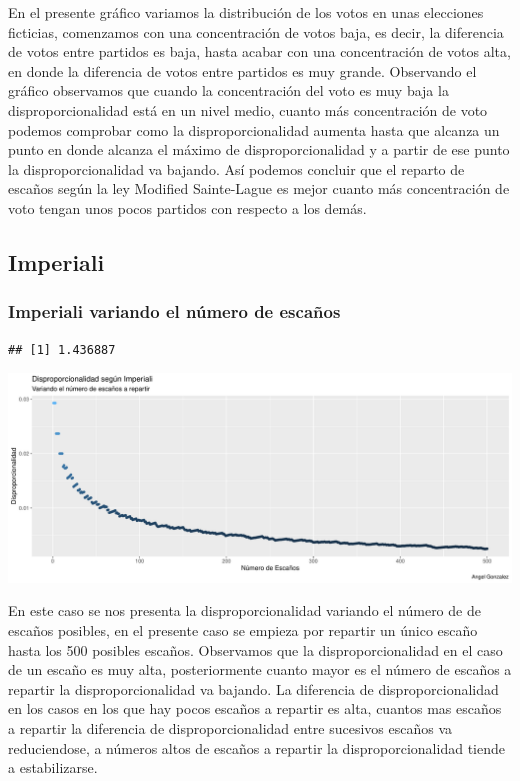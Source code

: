 \documentclass[12pt,a4paper,]{book}
\numberwithin{dummy}{section}
\theoremstyle{ocrenumbox}
\theoremstyle{blacknumex}
\theoremstyle{blacknumbox}
\theoremstyle{ocrenum}
\theoremstyle{ocrenum}
\begin{document}
En el presente gráfico variamos la distribución de los votos en unas
elecciones ficticias, comenzamos con una concentración de votos baja, es
decir, la diferencia de votos entre partidos es baja, hasta acabar con
una concentración de votos alta, en donde la diferencia de votos entre
partidos es muy grande. Observando el gráfico observamos que cuando la
concentración del voto es muy baja la disproporcionalidad está en un
nivel medio, cuanto más concentración de voto podemos comprobar como la
disproporcionalidad aumenta hasta que alcanza un punto en donde alcanza
el máximo de disproporcionalidad y a partir de ese punto la
disproporcionalidad va bajando. Así podemos concluir que el reparto de
escaños según la ley Modified Sainte-Lague es mejor cuanto más
concentración de voto tengan unos pocos partidos con respecto a los
demás.

\hypertarget{imperiali}{%
\subsection{Imperiali}\label{imperiali}}

\hypertarget{imperiali-variando-el-nuxfamero-de-escauxf1os}{%
\subsubsection{Imperiali variando el número de
escaños}\label{imperiali-variando-el-nuxfamero-de-escauxf1os}}

\begin{verbatim}
## [1] 1.436887
\end{verbatim}

\begin{center}\includegraphics[width=0.95\linewidth]{figurasR/unnamed-chunk-24-1} \end{center}

En este caso se nos presenta la disproporcionalidad variando el número
de de escaños posibles, en el presente caso se empieza por repartir un
único escaño hasta los 500 posibles escaños. Observamos que la
disproporcionalidad en el caso de un escaño es muy alta, posteriormente
cuanto mayor es el número de escaños a repartir la disproporcionalidad
va bajando. La diferencia de disproporcionalidad en los casos en los que
hay pocos escaños a repartir es alta, cuantos mas escaños a repartir la
diferencia de disproporcionalidad entre sucesivos escaños va
reduciendose, a números altos de escaños a repartir la
disproporcionalidad tiende a estabilizarse.
\end{document}
